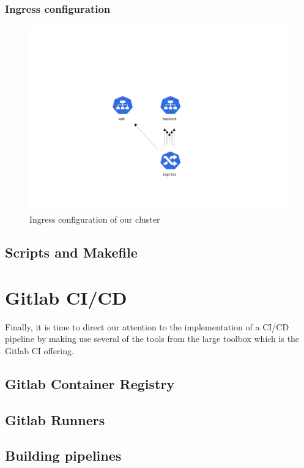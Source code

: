 \documentclass[thesis=B,english]{FITthesis}[2019/12/23]
\begin{document}
\subsubsection{Ingress configuration}
\begin{figure}[H]
\centering
\caption{Ingress configuration of our cluster}
\hspace*{-3cm}
\includegraphics[scale=0.5]{exposed-services-diagram}
\end{figure}

\subsection{Scripts and Makefile}

\section{Gitlab CI/CD}

Finally, it is time to direct our attention to the implementation of a CI/CD pipeline by making use several of the tools from the large toolbox which is the Gitlab CI offering.
 
\subsection{Gitlab Container Registry}

\subsection{Gitlab Runners}

\subsection{Building pipelines}
\end{document}

